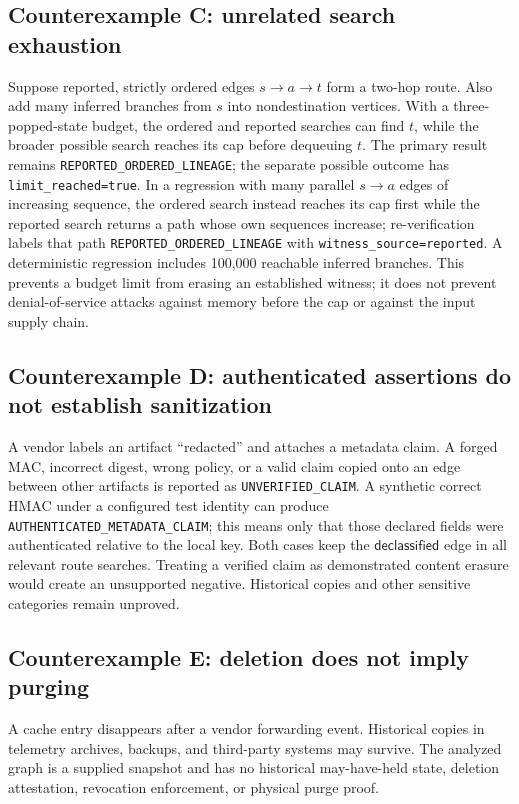 \documentclass[11pt,letterpaper]{article}
\newcommand{\code}[1]{\texttt{#1}}
\newcommand{\st}[1]{\texttt{\scriptsize #1}}
\begin{document}
\subsection{Counterexample C: unrelated search exhaustion}
Suppose reported, strictly ordered edges \(s\to a\to t\) form a two-hop route. Also add many inferred branches from \(s\) into nondestination vertices. With a three-popped-state budget, the ordered and reported searches can find \(t\), while the broader possible search reaches its cap before dequeuing \(t\). The primary result remains \st{REPORTED\_ORDERED\_LINEAGE}; the separate possible outcome has \code{limit\_reached=true}. In a regression with many parallel \(s\to a\) edges of increasing sequence, the ordered search instead reaches its cap first while the reported search returns a path whose own sequences increase; re-verification labels that path \st{REPORTED\_ORDERED\_LINEAGE} with \code{witness\_source=reported}. A deterministic regression includes 100,000 reachable inferred branches. This prevents a budget limit from erasing an established witness; it does not prevent denial-of-service attacks against memory before the cap or against the input supply chain.

\subsection{Counterexample D: authenticated assertions do not establish sanitization}
A vendor labels an artifact ``redacted'' and attaches a metadata claim. A forged MAC, incorrect digest, wrong policy, or a valid claim copied onto an edge between other artifacts is reported as \st{UNVERIFIED\_CLAIM}. A synthetic correct HMAC under a configured test identity can produce \st{AUTHENTICATED\_METADATA\_CLAIM}; this means only that those declared fields were authenticated relative to the local key. Both cases keep the \(\mathsf{declassified}\) edge in all relevant route searches. Treating a verified claim as demonstrated content erasure would create an unsupported negative. Historical copies and other sensitive categories remain unproved.

\subsection{Counterexample E: deletion does not imply purging}
A cache entry disappears after a vendor forwarding event. Historical copies in telemetry archives, backups, and third-party systems may survive. The analyzed graph is a supplied snapshot and has no historical may-have-held state, deletion attestation, revocation enforcement, or physical purge proof.
\end{document}
